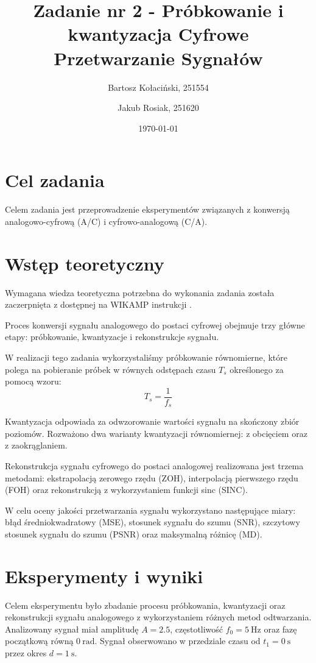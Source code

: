 \documentclass[12pt]{article}
\title{{\bf Zadanie nr 2 - Próbkowanie i kwantyzacja}\linebreak
	Cyfrowe Przetwarzanie Sygnałów}
\author{Bartosz Kołaciński, 251554 \and Jakub Rosiak, 251620}
\date{\today}
\begin{document}
	\clearpage\maketitle
	\thispagestyle{empty}
	\newpage
	\setcounter{page}{1}
	
	\section{Cel zadania}
	Celem zadania jest przeprowadzenie eksperymentów związanych z konwersją analogowo-cyfrową (A/C) i cyfrowo-analogową (C/A). 

	\section{Wstęp teoretyczny}

	Wymagana wiedza teoretyczna potrzebna do wykonania zadania została zaczerpnięta z dostępnej na WIKAMP instrukcji \cite{cps-zadanie2-instrukcja}.
	
	Proces konwersji sygnału analogowego do postaci cyfrowej obejmuje trzy główne etapy: próbkowanie, kwantyzacje i rekonstrukcje sygnału.
	
	W realizacji tego zadania wykorzystaliśmy próbkowanie równomierne, które polega na pobieranie próbek w równych odstępach czasu $T_s$ określonego za pomocą wzoru:
	\begin{equation}
		T_s = \frac{1}{f_s}
	\end{equation}
	
	Kwantyzacja odpowiada za odwzorowanie wartości sygnału na skończony zbiór poziomów. Rozważono dwa warianty kwantyzacji równomiernej: z obcięciem oraz z zaokrąglaniem.
	
	Rekonstrukcja sygnału cyfrowego do postaci analogowej realizowana jest trzema metodami: ekstrapolacją zerowego rzędu (ZOH), interpolacją pierwszego rzędu (FOH) oraz rekonstrukcją z wykorzystaniem funkcji sinc (SINC).
	
	W celu oceny jakości przetwarzania sygnału wykorzystano następujące miary: błąd średniokwadratowy (MSE), stosunek sygnału do szumu (SNR), szczytowy stosunek sygnału do szumu (PSNR) oraz maksymalną różnicę (MD).

\section{Eksperymenty i wyniki}


Celem eksperymentu było zbadanie procesu próbkowania, kwantyzacji oraz rekonstrukcji sygnału analogowego z wykorzystaniem różnych metod odtwarzania. Analizowany sygnał miał amplitudę $A = 2.5$, częstotliwość $f_0 = 5\ \mathrm{Hz}$ oraz fazę początkową równą $0\ \mathrm{rad}$. Sygnał obserwowano w przedziale czasu od $t_1 = 0\ \mathrm{s}$ przez okres $d = 1\ \mathrm{s}$.
\end{document}
